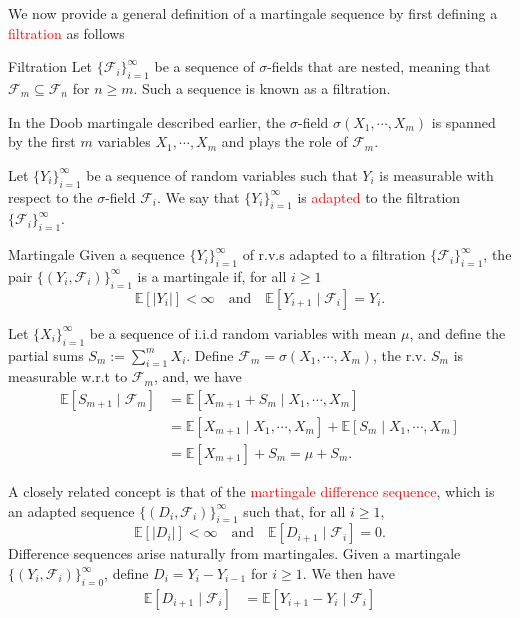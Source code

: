 \documentclass[10pt,handout,english]{beamer}
\newcommand{\E}{\mathbb{E}}
\newcommand{\F}{\mathcal{F}}
\newcommand{\1}{\mathbbm{1}}
\begin{document}
\begin{frame}[allowframebreaks]
We now provide a general definition of a martingale sequence by first defining a \textcolor{red}{filtration} as follows
\begin{block}{Filtration}
Let $\{\F_i\}_{i=1}^{\infty}$ be a sequence of $\sigma$-fields that are nested, meaning that $\F_{m}\subseteq\F_{n}$ for $n\geq m$. Such a sequence is known as a filtration.
\end{block}
In the Doob martingale described earlier, the $\sigma$-field $\sigma(X_1,\cdots,X_m)$ is spanned by the first $m$ variables $X_1,\cdots,X_m$ and plays the role of $\F_m$. 


Let $\{Y_i\}_{i=1}^{\infty}$ be a sequence of random variables such that $Y_i$ is measurable with respect to the $\sigma$-field $\F_{i}$. We say that $\{Y_i\}_{i=1}^{\infty}$ is \textcolor{red}{adapted} to the filtration $\{\F_{i}\}_{i=1}^{\infty}$. 
\begin{block}{Martingale}
Given a sequence $\{Y_{i}\}_{i=1}^{\infty}$ of r.v.s adapted to a filtration $\{\F_i\}_{i=1}^{\infty}$, the pair $\{(Y_i,\F_i)\}_{i=1}^{\infty}$ is a martingale if, for all $i\geq 1$
\[
\E[\lvert Y_i\rvert]<\infty\quad\text{and}\quad\E[Y_{i+1}\mid\F_{i}]=Y_{i}.
\]
\end{block}
\begin{example}
Let $\{X_i\}_{i=1}^{\infty}$ be a sequence of i.i.d random variables with mean $\mu$, and define the partial sums $S_m:=\sum\limits_{i=1}^mX_i$. Define $\F_{m}=\sigma(X_1,\cdots,X_m)$, the r.v. $S_m$ is measurable w.r.t to $\F_m$, and, we have
\begin{align*}
\E[S_{m+1}\mid \F_{m}]&=\E[X_{m+1}+S_{m}\mid X_1,\cdots,X_m ]\\
&=\E[X_{m+1}\mid X_1,\cdots,X_m]+\E[S_{m}\mid X_1,\cdots,X_m ]\\
&=\E[X_{m+1}]+S_m=\mu+S_m.
\end{align*}
\end{example}
A closely related concept is that of the \textcolor{red}{martingale difference sequence}, which is an adapted sequence $\{(D_i,\F_{i})\}_{i=1}^{\infty}$ such that, for all $i\geq 1$,
\[
\E[\lvert D_i\rvert]<\infty\quad\text{and}\quad\E[D_{i+1}\mid\F_{i}]=0.
\] 
Difference sequences arise naturally from martingales. Given a martingale $\{(Y_i,\F_{i})\}_{i=0}^{\infty}$, define $D_i=Y_i-Y_{i-1}$ for $i\geq 1$. We then have
\begin{align*}
\E[D_{i+1}\mid\F_{i}]&=\E[Y_{i+1}-Y_{i}\mid\F_i]\\

\end{align*}
\end{frame}
\end{document}
